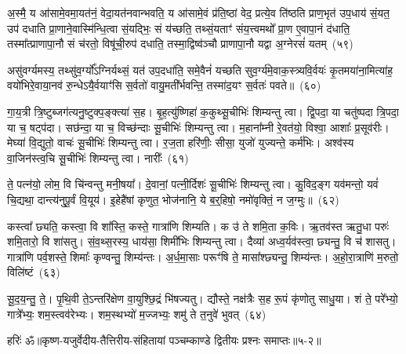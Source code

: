 अ॒स्मै॒ य आ॑सामे॒वमा॒यत॑नं॒ वेदा॒यत॑नवान्भवति॒ य आ॑सामे॒वं प्र॑ति॒ष्ठां वेद॒ प्रत्ये॒व ति॑ष्ठति प्राण॒भृत॑ उप॒धाय॑ सं॒यत॒ उप॑ दधाति प्रा॒णाने॒वास्मि॑न्धि॒त्वा सं॒यद्भिः॒ सं य॑च्छति॒ तथ्सं॒यताꣳ॑ संय॒त्त्वमथो᳚ प्रा॒ण ए॒वापा॒नं द॑धाति॒ तस्मा᳚त्प्राणापा॒नौ सं च॑रतो॒ विषू॑ची॒रुप॑ दधाति॒ तस्मा॒द्विष्व॑ञ्चौ प्राणापा॒नौ यद्वा अ॒ग्नेरसं॑ यतम्~(५९)

असु॑वर्ग्यमस्य॒ तथ्सु॑व॒र्ग्यो᳚\-ऽग्निर्यथ्सं॒ यत॑ उप॒दधा॑ति॒ समे॒वैनं॑ यच्छति सुव॒र्ग्य॑मे॒वाक॒स्त्र्यवि॒र्वयः॑ कृ॒तमया॑ना॒मित्या॑ह॒ वयो॑भिरे॒वाया॒नव॑ रु॒न्धे\-ऽयै॒र्वयाꣳ॑सि स॒र्वतो॑ वायु॒मती᳚र्भवन्ति॒ तस्मा॑द॒यꣳ स॒र्वतः॑ पवते॥~(६०)

{\anuvakamend[{प॒श्चादे॒ताः पु॒रो᳚\-ऽक्ष्ण॒या कल्प॒ते\-ऽसं॑ यतं॒ पञ्च॑त्रिꣳशच्च}]}%

गा॒य॒त्री त्रि॒ष्टुब्जग॑त्यनु॒ष्टुक्प॒ङ्क्त्या॑ स॒ह। बृ॒ह॒त्यु॑ष्णिहा॑ क॒कुथ्सू॒चीभिः॑ शिम्यन्तु त्वा। द्वि॒पदा॒ या चतु॑ष्पदा त्रि॒पदा॒ या च॒ षट्प॑दा। सछ॑न्दा॒ या च॒ विच्छ॑न्दाः सू॒चीभिः॑ शिम्यन्तु त्वा। म॒हाना᳚म्नी रे॒वत॑यो॒ विश्वा॒ आशाः᳚ प्र॒सूव॑रीः। मेघ्या॑ वि॒द्युतो॒ वाचः॑ सू॒चीभिः॑ शिम्यन्तु त्वा। र॒ज॒ता हरि॑णीः॒ सीसा॒ युजो॑ युज्यन्ते॒ कर्म॑भिः। अश्व॑स्य वा॒जिन॑स्त्व॒चि सू॒चीभिः॑ शिम्यन्तु त्वा। नारीः᳚~(६१)

ते॒ पत्न॑यो॒ लोम॒ वि चि॑न्वन्तु मनी॒षया᳚। दे॒वानां॒ पत्नी॒र्दिशः॑ सू॒चीभिः॑ शिम्यन्तु त्वा। कु॒विद॒ङ्ग यव॑मन्तो॒ यवं॑ चि॒द्यथा॒ दान्त्य॑नुपू॒र्वं वि॒यूय॑। इ॒हेहै॑षां कृणुत॒ भोज॑नानि॒ ये ब॒र्॒\mbox{}हिषो॒ नमो॑वृक्तिं॒ न ज॒ग्मुः॥~(६२)

{\anuvakamend[{नारी᳚स्त्रि॒ꣳ॒शच्च॑}]}%

कस्त्वा᳚ छ्यति॒ कस्त्वा॒ वि शा᳚स्ति॒ कस्ते॒ गात्रा॑णि शिम्यति। क उ॑ ते शमि॒ता क॒विः। ऋ॒तव॑स्त ऋतु॒धा परुः॑ शमि॒तारो॒ वि शा॑सतु। सं॒व॒थ्स॒रस्य॒ धाय॑सा॒ शिमी॑भिः शिम्यन्तु त्वा। दैव्या॑ अध्व॒र्यव॑स्त्वा॒ छ्यन्तु॒ वि च॑ शासतु। गात्रा॑णि पर्व॒शस्ते॒ शिमाः᳚ कृण्वन्तु॒ शिम्य॑न्तः। अ॒र्ध॒मा॒साः परूꣳ॑षि ते॒ मासा᳚श्छ्यन्तु॒ शिम्य॑न्तः। अ॒हो॒रा॒त्राणि॑ म॒रुतो॒ विलि॑ष्टं~(६३)

सू॒द॒य॒न्तु॒ ते॒। पृ॒थि॒वी ते॒\-ऽन्तरि॑क्षेण वा॒युश्छि॒द्रं भि॑षज्यतु। द्यौस्ते॒ नक्ष॑त्रैः स॒ह रू॒पं कृ॑णोतु साधु॒या। शं ते॒ परे᳚भ्यो॒ गात्रे᳚भ्यः॒ शम॒स्त्वव॑रेभ्यः। शम॒स्थभ्यो॑ म॒ज्जभ्यः॒ शमु॑ ते त॒नुवे॑ भुवत्~(६४)

{\anuvakamend[{विलि॑ष्टन्त्रि॒ꣳ॒शच्च॑}]}%

{हरिः॑ ॐ}{॥कृष्ण-यजुर्वेदीय-तैत्तिरीय-संहितायां पञ्चम्काण्डे द्वितीयः प्रश्नः समाप्तः॥५-२॥}
